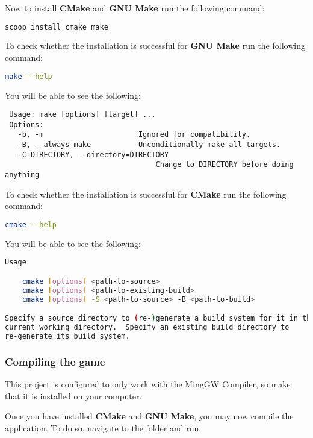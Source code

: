 Now to install \textbf{CMake} and \textbf{GNU Make} run the following
command:

\begin{lstlisting}[language=bash]
 scoop install cmake make 
\end{lstlisting}
 
To check whether the installation is successful for \textbf{GNU Make} run the following command:

\begin{lstlisting}[language=bash]
make --help
\end{lstlisting}

You will be able to see the following:
\begin{lstlisting}
 Usage: make [options] [target] ...
 Options:
   -b, -m                      Ignored for compatibility.
   -B, --always-make           Unconditionally make all targets.
   -C DIRECTORY, --directory=DIRECTORY
                                   Change to DIRECTORY before doing anything
\end{lstlisting}
    
To check whether the installation is successful for \textbf{CMake} run the following command:

\begin{lstlisting}[language=bash]
cmake --help
\end{lstlisting}

You will be able to see the following:

\begin{lstlisting}[language=bash]
Usage

    cmake [options] <path-to-source>
    cmake [options] <path-to-existing-build>
    cmake [options] -S <path-to-source> -B <path-to-build>

Specify a source directory to (re-)generate a build system for it in the
current working directory.  Specify an existing build directory to
re-generate its build system.
\end{lstlisting}

\subsubsection{Compiling the game}

This project is configured to only work with
the MingGW Compiler, so make that it is installed on your computer.

Once you have installed \textbf{CMake} and \textbf{GNU Make}, you may now
compile the application. To do so, navigate to the 
folder and run.
 
